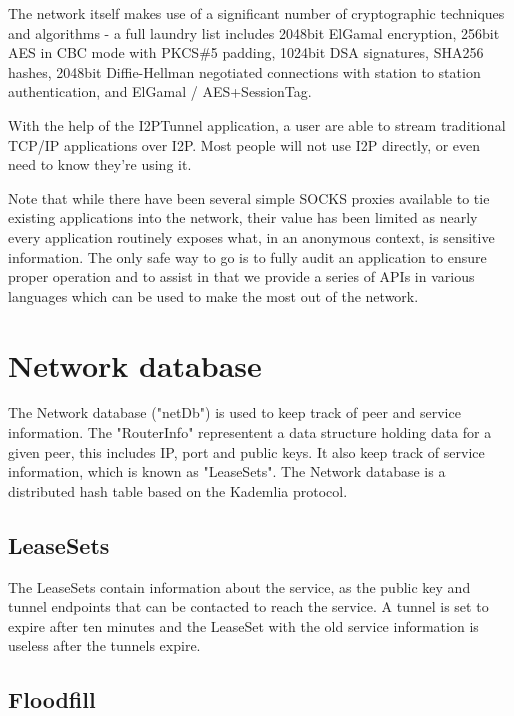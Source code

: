 \documentclass[a4paper,twocolumn,12pt]{article}
\begin{document}
The network itself makes use of a significant number of cryptographic techniques and algorithms - a full laundry list includes 2048bit ElGamal\cite{DBLP:journals/tit/Elgamal85} encryption, 256bit AES\cite{books/sp/DaemenR02} in CBC mode with PKCS\#5 padding, 1024bit DSA signatures, SHA256 hashes, 2048bit Diffie-Hellman negotiated connections with station to station authentication, and ElGamal\cite{DBLP:journals/tit/Elgamal85} / AES+SessionTag.

\vspace{2 em}

With the help of the I2PTunnel application, a user are able to stream traditional TCP/IP applications over I2P. Most people will not use I2P directly, or even need to know they're using it.

Note that while there have been several simple SOCKS proxies available to tie existing applications into the network, their value has been limited as nearly every application routinely exposes what, in an anonymous context, is sensitive information. The only safe way to go is to fully audit an application to ensure proper operation and to assist in that we provide a series of APIs in various languages which can be used to make the most out of the network.

\section{Network database}

The Network database ("netDb") is used to keep track of peer and service information. The "RouterInfo" representent a data structure holding data for a given peer, this includes IP, port and public keys. It also keep track of service information, which is known as "LeaseSets". The Network database is a distributed hash table based on the Kademlia\cite{Maymounkov:2002:KPI:646334.687801} protocol.

\subsection{LeaseSets}

The LeaseSets contain information about the service, as the public key and tunnel endpoints that can be contacted to reach the service. A tunnel is set to expire after ten minutes and the LeaseSet with the old service information is useless after the tunnels expire. 

\subsection{Floodfill}
\end{document}
